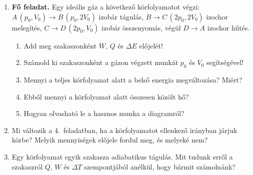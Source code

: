 \documentclass[12pt]{article}
\begin{document}
\begin{enumerate}
\item \begin{minipage}[t]{0.68\linewidth}
  \textbf{Fő feladat.} Egy ideális gáz a következő körfolyamatot végzi:
  $A\,(p_0, V_0) \to B\,(p_0, 2V_0)$ izobár tágulás,
  $B \to C\,(2p_0, 2V_0)$ izochor melegítés,
  $C \to D\,(2p_0, V_0)$ izobár összenyomás, végül $D \to A$ izochor hűtés.
  \begin{enumerate}
    \item Add meg szakaszonként $W$, $Q$ és $\Delta E$ előjelét!
    \item Számold ki szakaszonként a gázon végzett munkát $p_0$ és $V_0$ segítségével!
    \item Mennyi a teljes körfolyamat alatt a belső energia megváltozása? Miért?
    \item Ebből mennyi a körfolyamat alatt összesen közölt hő?
    \item Hogyan olvasható le a hasznos munka a diagramról?
  \end{enumerate}
  \end{minipage}\hfill
  \begin{minipage}[t]{0.28\linewidth}\vspace{-0.7cm}\centering
  \end{minipage}

\item Mi változik a 4.~feladatban, ha a körfolyamatot ellenkező irányban járjuk körbe?
  Melyik mennyiségek előjele fordul meg, és melyeké nem?

\item Egy körfolyamat egyik szakasza adiabatikus tágulás. Mit tudunk erről a szakaszról
  $Q$, $W$ és $\Delta T$ szempontjából anélkül, hogy bármit számolnánk?
\end{enumerate}
\end{document}
